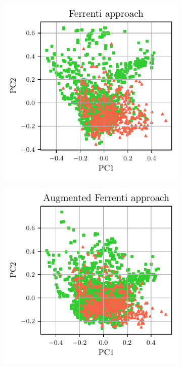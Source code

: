 \documentclass[superscriptaddress,unsortedaddress,
 amsmath,amssymb,
 aps,
]{revtex4-2}
\begin{document}
\begin{figure}%
    \centering
    \begin{subfigure}{0.3\textwidth}
        \centering
        \includegraphics[width=1\textwidth]{figures/pca-2d-plots/01-ferrenti-approach-v2.pdf}
    \end{subfigure}%
    \begin{subfigure}{0.3\textwidth}
        \centering
        \includegraphics[width=1\textwidth]{figures/pca-2d-plots/02-augmented-ferrenti-approach.pdf}

\end{subfigure}
\end{figure}
\end{document}

